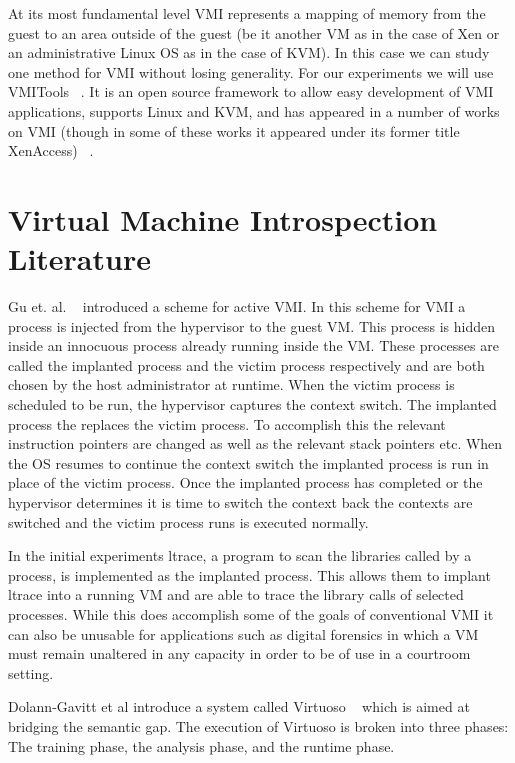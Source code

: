 At its most fundamental level VMI represents a mapping of memory from the guest to an area outside of the guest (be it another VM as in the case of Xen or an administrative Linux OS as in the case of KVM). In this case we can study one method for VMI without losing generality. For our experiments we will use VMITools ~\cite{payne_vmitools_2014}. It is an open source framework to allow easy development of VMI applications, supports Linux and KVM, and has appeared in a number of works on VMI (though in some of these works it appeared under its former title XenAccess) ~\cite{dolan-gavitt_leveraging_2011, zhao_vrfps:_2009, lengyel_virtual_2012, weingartner_promox:_2009, marken_using_2014}.

\section{Virtual Machine Introspection Literature}

Gu et. al. ~\cite{gu_process_2011-1} introduced a scheme for active VMI. In this scheme for VMI a process is injected from the hypervisor to the guest VM. This process is hidden inside an innocuous process already running inside the VM. These processes are called the implanted process and the victim process respectively and are both chosen by the host administrator at runtime. When the victim process is scheduled to be run, the hypervisor captures the context switch. The implanted process the replaces the victim process. To accomplish this the relevant instruction pointers are changed as well as the relevant stack pointers etc. When the OS resumes to continue the context switch the implanted process is run in place of the victim process. Once the implanted process has completed or the hypervisor determines it is time to switch the context back the contexts are switched and the victim process runs is executed normally. 

In the initial experiments ltrace, a program to scan the libraries called by a process, is implemented as the implanted process. This allows them to implant ltrace into a running VM and are able to trace the library calls of selected processes. While this does accomplish some of the goals of conventional VMI it can also be unusable for applications such as digital forensics in which a VM must remain unaltered in any capacity in order to be of use in a courtroom setting. 

Dolann-Gavitt et al introduce a system called Virtuoso ~\cite{dolan-gavitt_virtuoso:_2011} which is aimed at bridging the semantic gap. The execution of Virtuoso is broken into three phases: The training phase, the analysis phase, and the runtime phase. 

